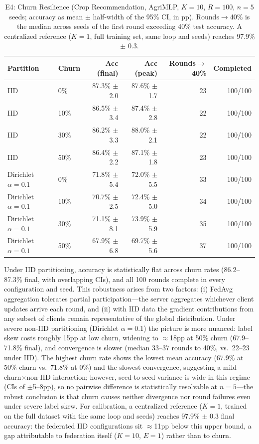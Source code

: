 \documentclass[a4paper,fleqn]{cas-dc}
\begin{document}
\begin{table}[t]
\centering
\caption{E4: Churn Resilience (Crop Recommendation, AgriMLP, $K{=}10$, $R{=}100$, $n{=}5$ seeds; accuracy as mean $\pm$ half-width of the 95\% CI, in pp). Rounds$\to$40\% is the median across seeds of the first round exceeding 40\% test accuracy. A centralized reference ($K{=}1$, full training set, same loop and seeds) reaches 97.9\% $\pm$ 0.3.}
\label{tab:e4}
\footnotesize
\begin{tabular}{l l r r r r}
\toprule
\textbf{Partition} & \textbf{Churn} & \textbf{Acc (final)} & \textbf{Acc (peak)} & \textbf{Rounds$\to$40\%} & \textbf{Completed} \\
\midrule
IID & 0\%  & 87.3\% $\pm$ 2.0 & 87.6\% $\pm$ 1.7 & 23 & 100/100 \\
IID & 10\% & 86.5\% $\pm$ 3.4 & 87.4\% $\pm$ 2.8 & 22 & 100/100 \\
IID & 30\% & 86.2\% $\pm$ 3.3 & 88.0\% $\pm$ 2.1 & 22 & 100/100 \\
IID & 50\% & 86.4\% $\pm$ 2.2 & 87.1\% $\pm$ 1.8 & 23 & 100/100 \\
\midrule
Dirichlet $\alpha{=}0.1$ & 0\%  & 71.8\% $\pm$ 5.4 & 72.0\% $\pm$ 5.5 & 33 & 100/100 \\
Dirichlet $\alpha{=}0.1$ & 10\% & 70.7\% $\pm$ 2.5 & 72.4\% $\pm$ 5.0 & 34 & 100/100 \\
Dirichlet $\alpha{=}0.1$ & 30\% & 71.1\% $\pm$ 8.1 & 73.9\% $\pm$ 5.9 & 35 & 100/100 \\
Dirichlet $\alpha{=}0.1$ & 50\% & 67.9\% $\pm$ 6.8 & 69.7\% $\pm$ 5.6 & 37 & 100/100 \\
\bottomrule
\end{tabular}
\end{table}

Under IID partitioning, accuracy is statistically flat across churn rates (86.2--87.3\% final, with overlapping CIs), and all 100 rounds complete in every configuration and seed. This robustness arises from two factors: (i) FedAvg aggregation tolerates partial participation---the server aggregates whichever client updates arrive each round, and (ii) with IID data the gradient contributions from any subset of clients remain representative of the global distribution. Under severe non-IID partitioning (Dirichlet $\alpha{=}0.1$) the picture is more nuanced: label skew costs roughly 15pp at low churn, widening to $\approx$18pp at 50\% churn (67.9--71.8\% final), and convergence is slower (median 33--37 rounds to 40\%, vs.\ 22--23 under IID). The highest churn rate shows the lowest mean accuracy (67.9\% at 50\% churn vs.\ 71.8\% at 0\%) and the slowest convergence, suggesting a mild churn$\times$non-IID interaction; however, seed-to-seed variance is wide in this regime (CIs of $\pm$5--8pp), so no pairwise difference is statistically resolvable at $n{=}5$---the robust conclusion is that churn causes neither divergence nor round failures even under severe label skew. For calibration, a centralized reference ($K{=}1$, trained on the full dataset with the same loop and seeds) reaches 97.9\% $\pm$ 0.3 final accuracy: the federated IID configurations sit $\approx$11pp below this upper bound, a gap attributable to federation itself ($K{=}10$, $E{=}1$) rather than to churn.
\end{document}
